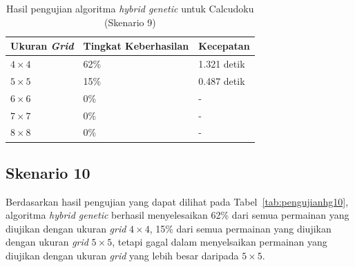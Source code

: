 \begin{table}
\centering
\captionsetup{justification=centering}
\caption[Hasil pengujian algoritma \textit{hybrid genetic} untuk Calcudoku (Skenario 9)]{Hasil pengujian algoritma \textit{hybrid genetic} untuk Calcudoku (Skenario 9)}
\begin{tabular}{| l | l | l |}
\hline
Ukuran \textit{Grid} & Tingkat Keberhasilan & Kecepatan \\
\hline \hline
\begin{math}4 \times 4\end{math} & 62\% & 1.321 detik \\
\hline
\begin{math}5 \times 5\end{math} & 15\% & 0.487 detik \\
\hline
\begin{math}6 \times 6\end{math} & 0\% & - \\
\hline
\begin{math}7 \times 7\end{math} & 0\% & - \\
\hline
\begin{math}8 \times 8\end{math} & 0\% & - \\
\hline
\end{tabular}
\label{tab:pengujianhg9}
\end{table}

\subsection{Skenario 10}
\label{sec:skenario10}

Berdasarkan hasil pengujian yang dapat dilihat pada Tabel~\ref{tab:pengujianhg10}, algoritma \textit{hybrid genetic} berhasil menyelesaikan 62\% dari semua permainan yang diujikan dengan ukuran \textit{grid} \begin{math}4 \times 4\end{math}, 15\% dari semua permainan yang diujikan dengan ukuran \textit{grid} \begin{math}5 \times 5\end{math}, tetapi gagal dalam menyelsaikan permainan yang diujikan dengan ukuran \textit{grid} yang lebih besar daripada \begin{math}5 \times 5\end{math}.

